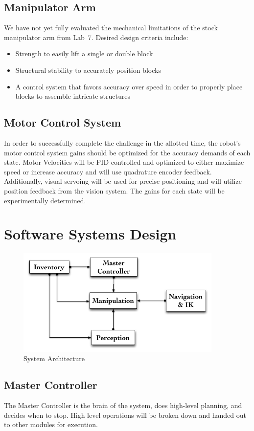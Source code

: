 \documentclass[letterpaper,11pt]{article}
\begin{document}
\subsection{Manipulator Arm}
We have not yet fully evaluated the mechanical limitations of the stock manipulator arm from Lab~7. Desired design criteria include:
\begin{itemize}
\item Strength to easily lift a single or double block
\item Structural stability to accurately position blocks
\item A control system that favors accuracy over speed in order to properly place blocks to assemble intricate structures
\end{itemize}
\subsection {Motor Control System}
In order to successfully complete the challenge in the allotted time, the robot's motor control system gains should be optimized for the accuracy demands of each state. Motor Velocities will be PID controlled and optimized to either maximize speed or increase accuracy and will use quadrature encoder feedback. Additionally, visual servoing will be used for precise positioning and will utilize position feedback from the vision system. The gains for each state will be experimentally determined. 
\section{Software Systems Design}
\begin{figure}[h]
\centering
 \includegraphics[width=4in]{images/System_Architecture}
\caption{System Architecture}
\end{figure}

\subsection{Master Controller}
The Master Controller is the brain of the system, does high-level planning, and decides when to stop.
High level operations will be broken down and handed out to other modules for execution.
\end{document}
